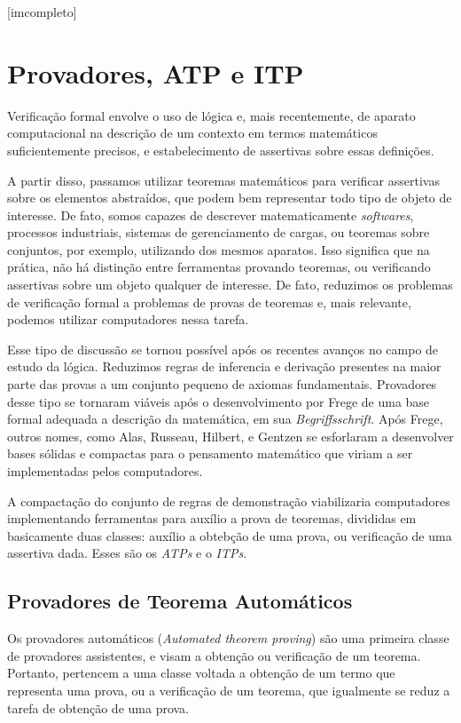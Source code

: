 [imcompleto]

\section{Provadores, ATP e ITP}

Verificação formal envolve o uso de lógica e, mais recentemente, de aparato computacional na descrição de um contexto em termos matemáticos suficientemente precisos, e estabelecimento de assertivas sobre essas definições.

A partir disso, passamos utilizar teoremas matemáticos para verificar assertivas sobre os elementos abstraídos, que podem bem representar todo tipo de objeto de interesse.
De fato, somos capazes de descrever matematicamente \textit{softwares}, processos industriais, sistemas de gerenciamento de cargas, ou teoremas sobre conjuntos, por exemplo, utilizando dos mesmos aparatos.
Isso significa que na prática, não há distinção entre ferramentas provando teoremas, ou verificando assertivas sobre um objeto qualquer de interesse.
De fato, reduzimos os problemas de verificação formal a problemas de provas de teoremas e, mais relevante, podemos utilizar computadores nessa tarefa.

Esse tipo de discussão se tornou possível após os recentes avanços no campo de estudo da lógica.
Reduzimos regras de inferencia e derivação presentes na maior parte das provas a um conjunto pequeno de axiomas fundamentais.
Provadores desse tipo se tornaram viáveis após o desenvolvimento por Frege de uma base formal adequada a descrição da matemática, em sua \textit{Begriffsschrift}.
Após Frege, outros nomes, como Alas, Russeau, Hilbert, e Gentzen se esforlaram a desenvolver bases sólidas e compactas para o pensamento matemático que viriam a ser implementadas pelos computadores.

A compactação do conjunto de regras de demonstração viabilizaria computadores implementando ferramentas para auxílio a prova de teoremas, divididas em basicamente duas classes: auxílio a obtebção de uma prova, ou verificação de uma assertiva dada. Esses são os \textit{ATPs} e o \textit{ITPs}.

\subsection{Provadores de Teorema Automáticos}
Os provadores automáticos (\textit{Automated theorem proving}) são uma primeira classe de provadores assistentes, e visam a obtenção ou verificação de um teorema.
Portanto, pertencem a uma classe voltada a obtenção de um termo que representa uma prova, ou a verificação de um teorema, que igualmente se reduz a tarefa de obtenção de uma prova.

